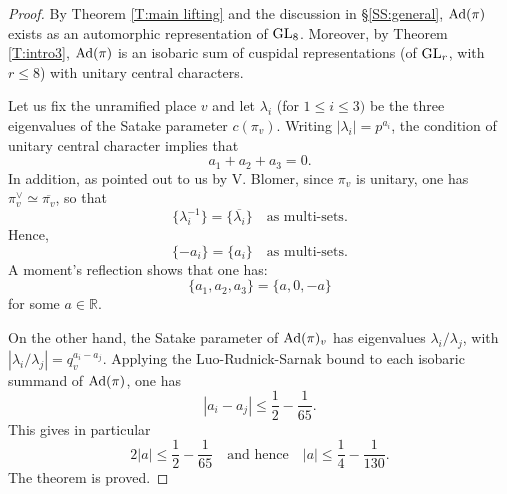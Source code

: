 \documentclass[11pt]{amsart}
\theoremstyle{plain}
\newtheorem{cor}[equation]{Corollary}
\numberwithin{equation}{section}
\newcommand{\R}{\mathbb R}
\def\GL{{\rm GL}}
\def\R{{\mathbb R}}
\begin{document}
\begin{proof}
By Theorem \ref{T:main lifting} and the discussion in \S\ref{SS:general}, ${\rm Ad}(\pi)$ exists as an automorphic representation of $\GL_8$. 
Moreover, by Theorem \ref{T:intro3}, ${\rm Ad}(\pi)$ is an isobaric sum of cuspidal representations (of $\GL_r$, with $r \leq 8$)  with unitary central characters. 

 \vskip 5pt
 
 Let us fix the unramified place $v$ and let $\lambda_i$  (for $1 \leq i \leq 3)$ be the three eigenvalues of the Satake parameter $c(\pi_v)$. Writing $|\lambda_i| = p^{a_i}$, the condition of unitary central character implies that
 \[ a_1 + a_2 + a_3 =0. \]
 In addition, as pointed out to us by V. Blomer, since $\pi_v$ is unitary, one has $\pi_v^{\vee} \simeq \overline{\pi_v}$, so that
 \[   \{  \lambda_i^{-1} \} = \{ \overline{\lambda_i} \} \quad \text{as multi-sets.} \]
Hence,
\[  \{ -a_i \} = \{ a_i \} \quad \text{as multi-sets.} \]
A moment's reflection  shows that  one has:
\[  \{ a_1, a_2, a_3 \} = \{ a, 0, -a \} \]
for some $a \in \R$.  
 \vskip 5pt
 
 On the other hand, the Satake parameter of ${\rm Ad}(\pi)_v$  has eigenvalues $\lambda_i/ \lambda_j$, with $|\lambda_i/\lambda_j| = q_v^{a_i-a_j}$.
 Applying the Luo-Rudnick-Sarnak bound to each isobaric summand of ${\rm Ad}(\pi)$, one has
 \[   |a_i -a_j| \leq \frac{1}{2} - \frac{1}{65}. \]
 This gives in particular
 \[  2 |a| \leq \frac{1}{2} - \frac{1}{65} \quad \text{and hence} \quad |a| \leq \frac{1}{4} - \frac{1}{130}. \]
 The theorem is proved.
   \vskip 5pt
 
\end{proof}

\vskip 5pt


\end{document}
